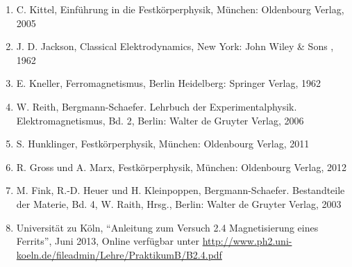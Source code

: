 \documentclass[12pt,a4paper]{scrartcl}
\numberwithin{equation}{section} %
\renewcommand{\[}{} %
\renewcommand{\]}{\noindent} %
\newcommand{\tightlist}{} %
\begin{document}
\begin{enumerate}
\def\labelenumi{\arabic{enumi}.}
\tightlist
\item
  C. Kittel, Einführung in die Festkörperphysik, München: Oldenbourg
  Verlag, 2005
\item
  J. D. Jackson, Classical Elektrodynamics, New York: John Wiley \& Sons
  , 1962
\item
  E. Kneller, Ferromagnetismus, Berlin Heidelberg: Springer Verlag, 1962
\item
  W. Reith, Bergmann-Schaefer. Lehrbuch der Experimentalphysik.
  Elektromagnetismus, Bd. 2, Berlin: Walter de Gruyter Verlag, 2006
\item
  S. Hunklinger, Festkörperphysik, München: Oldenbourg Verlag, 2011
\item
  R. Gross und A. Marx, Festkörperphysik, München: Oldenbourg Verlag,
  2012
\item
  M. Fink, R.-D. Heuer und H. Kleinpoppen, Bergmann-Schaefer.
  Bestandteile der Materie, Bd. 4, W. Raith, Hrsg., Berlin: Walter de
  Gruyter Verlag, 2003
\item
  Universität zu Köln, ``Anleitung zum Versuch 2.4 Magnetisierung eines
  Ferrits'', Juni 2013, Online verfügbar unter
  \url{http://www.ph2.uni-koeln.de/fileadmin/Lehre/PraktikumB/B2.4.pdf}
\end{enumerate}
\end{document}
